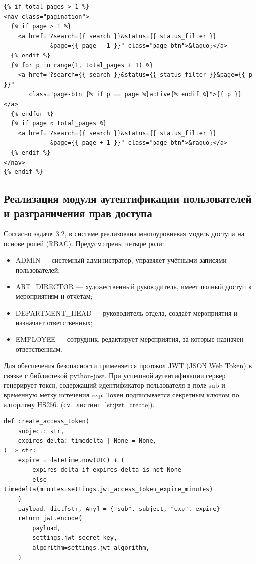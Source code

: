 \begin{lstlisting}[caption={Фрагмент шаблона пагинации}, label={lst:pagination}]
{% if total_pages > 1 %}
<nav class="pagination">
  {% if page > 1 %}
    <a href="?search={{ search }}&status={{ status_filter }}
             &page={{ page - 1 }}" class="page-btn">&laquo;</a>
  {% endif %}
  {% for p in range(1, total_pages + 1) %}
    <a href="?search={{ search }}&status={{ status_filter }}&page={{ p }}"
       class="page-btn {% if p == page %}active{% endif %}">{{ p }}</a>
  {% endfor %}
  {% if page < total_pages %}
    <a href="?search={{ search }}&status={{ status_filter }}
             &page={{ page + 1 }}" class="page-btn">&raquo;</a>
  {% endif %}
</nav>
{% endif %}
\end{lstlisting}
\newpage
\subsection{Реализация модуля аутентификации пользователей и разграничения прав доступа}

Согласно задаче~3.2, в системе реализована многоуровневая модель доступа на
основе ролей (RBAC). Предусмотрены четыре роли:
\begin{itemize}
    \item ADMIN --- системный администратор, управляет учётными
          записями пользователей;
    \item ART\_DIRECTOR --- художественный руководитель, имеет
          полный доступ к мероприятиям и отчётам;
    \item DEPARTMENT\_HEAD --- руководитель отдела, создаёт
          мероприятия и назначает ответственных;
    \item EMPLOYEE --- сотрудник, редактирует мероприятия,
          за которые назначен ответственным.
\end{itemize}

Для обеспечения безопасности применяется протокол JWT (JSON Web Token) в связке с библиотекой python-jose. При успешной аутентификации сервер генерирует токен, содержащий идентификатор пользователя в поле sub и временную метку истечения exp.
Токен подписывается секретным ключом по алгоритму HS256.
(см.\ листинг~\ref{lst:jwt_create}).

\begin{lstlisting}[caption={Функция генерации JWT-токена}, label={lst:jwt_create}]
def create_access_token(
    subject: str,
    expires_delta: timedelta | None = None,
) -> str:
    expire = datetime.now(UTC) + (
        expires_delta if expires_delta is not None
        else timedelta(minutes=settings.jwt_access_token_expire_minutes)
    )
    payload: dict[str, Any] = {"sub": subject, "exp": expire}
    return jwt.encode(
        payload,
        settings.jwt_secret_key,
        algorithm=settings.jwt_algorithm,
    )
\end{lstlisting}

